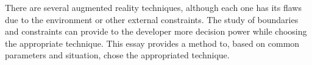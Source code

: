 There are several augmented reality techniques, although each one has its flaws due to the environment or other external constraints. The study of boundaries and constraints can provide to the developer more decision power while choosing the appropriate technique. This essay provides a method to, based on common parameters and situation, chose the appropriated technique.